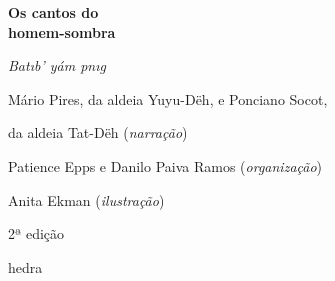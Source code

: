 




\begingroup\thispagestyle{empty}\vspace*{.05\textheight} 

              {\formular
              \huge
              \noindent
              \textbf{Os cantos do\\ homem-sombra}

              \vspace{0.6em}
              
              \Large
              \noindent
              \textit{Bat\i{}b’ yám p\I{}n\i{}g}
              }              
              \vspace{7em}

              
              \small\noindent 
              Mário Pires, da aldeia Yuyu-Dëh, e Ponciano Socot,
              \vspace{-0.05cm}

              \noindent 
              da aldeia Tat-Dëh (\textit{narração})

              \medskip

              \noindent 
              Patience Epps e Danilo Paiva Ramos (\textit{organização})

              \medskip
              
              \noindent 
              Anita Ekman (\textit{ilustração})

              \bigskip

              \noindent
              2ª edição

              \vfill

              \newfontfamily{}
              {\noindent\fontsize{30}{40}\selectfont \timesnewroman hedra}



\endgroup
\pagebreak
